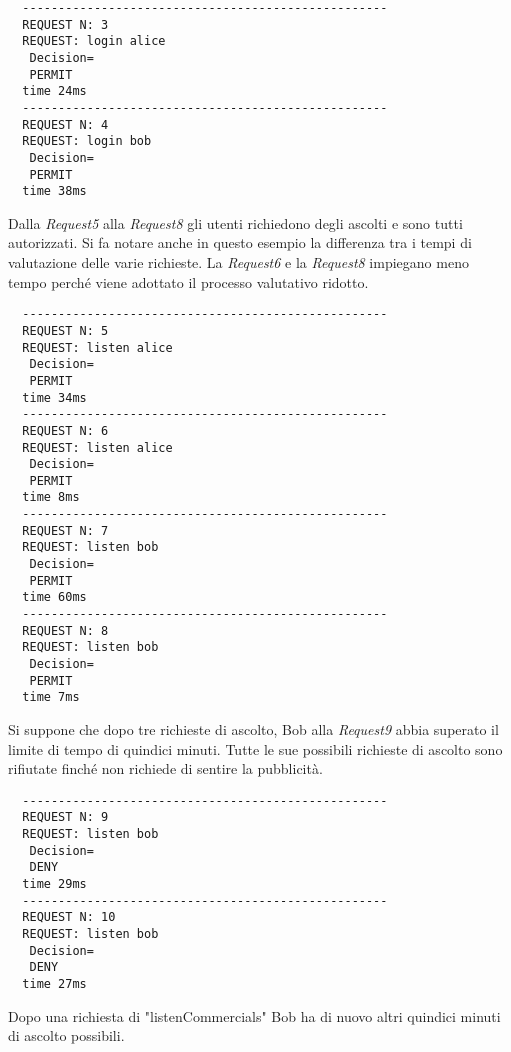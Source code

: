 
\begin{verbatim}
  ---------------------------------------------------
  REQUEST N: 3
  REQUEST: login alice
   Decision=
   PERMIT
  time 24ms
  ---------------------------------------------------
  REQUEST N: 4
  REQUEST: login bob
   Decision=
   PERMIT
  time 38ms
\end{verbatim}
Dalla \emph{Request5} alla \emph{Request8} gli utenti richiedono degli ascolti e sono tutti autorizzati. Si fa notare anche
in questo esempio la differenza tra i tempi di valutazione delle varie richieste. La \emph{Request6} e la \emph{Request8}
impiegano meno tempo perché viene adottato il processo valutativo ridotto.

\begin{verbatim}
  ---------------------------------------------------
  REQUEST N: 5
  REQUEST: listen alice
   Decision=
   PERMIT
  time 34ms
  ---------------------------------------------------
  REQUEST N: 6
  REQUEST: listen alice
   Decision=
   PERMIT
  time 8ms
  ---------------------------------------------------
  REQUEST N: 7
  REQUEST: listen bob
   Decision=
   PERMIT
  time 60ms
  ---------------------------------------------------
  REQUEST N: 8
  REQUEST: listen bob
   Decision=
   PERMIT
  time 7ms
\end{verbatim}
Si suppone che dopo tre richieste di ascolto, Bob alla \emph{Request9} abbia superato il limite di tempo di quindici minuti.
Tutte le sue possibili richieste di ascolto sono rifiutate finché non richiede di sentire la pubblicità.

\begin{verbatim}
  ---------------------------------------------------
  REQUEST N: 9
  REQUEST: listen bob
   Decision=
   DENY
  time 29ms
  ---------------------------------------------------
  REQUEST N: 10
  REQUEST: listen bob
   Decision=
   DENY
  time 27ms
\end{verbatim}
Dopo una richiesta di "listenCommercials" Bob ha di nuovo altri quindici minuti di ascolto possibili.

